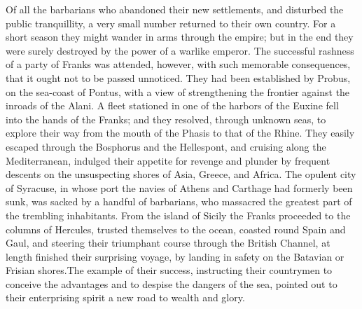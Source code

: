 



Of all the barbarians who abandoned their new settlements, and
disturbed the public tranquillity, a very small number returned
to their own country. For a short season they might wander in
arms through the empire; but in the end they were surely
destroyed by the power of a warlike emperor. The successful
rashness of a party of Franks was attended, however, with such
memorable consequences, that it ought not to be passed unnoticed.
They had been established by Probus, on the sea-coast of Pontus,
with a view of strengthening the frontier against the inroads of
the Alani. A fleet stationed in one of the harbors of the Euxine
fell into the hands of the Franks; and they resolved, through
unknown seas, to explore their way from the mouth of the Phasis
to that of the Rhine. They easily escaped through the Bosphorus
and the Hellespont, and cruising along the Mediterranean,
indulged their appetite for revenge and plunder by frequent
descents on the unsuspecting shores of Asia, Greece, and Africa.
The opulent city of Syracuse, in whose port the navies of Athens
and Carthage had formerly been sunk, was sacked by a handful of
barbarians, who massacred the greatest part of the trembling
inhabitants. From the island of Sicily the Franks proceeded to
the columns of Hercules, trusted themselves to the ocean, coasted
round Spain and Gaul, and steering their triumphant course
through the British Channel, at length finished their surprising
voyage, by landing in safety on the Batavian or Frisian shores.\footnotemark[50]
The example of their success, instructing their countrymen to
conceive the advantages and to despise the dangers of the sea,
pointed out to their enterprising spirit a new road to wealth and
glory.


